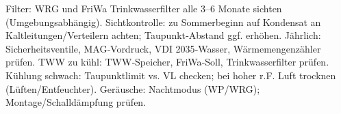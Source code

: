 {}\markdownRendererUlBeginTight
\markdownRendererUlItem Filter: WRG und FriWa Trinkwasserfilter alle 3–6 Monate sichten (Umgebungsabhängig).\markdownRendererUlItemEnd 
\markdownRendererUlItem Sichtkontrolle: zu Sommerbeginn auf Kondensat an Kaltleitungen/Verteilern achten; Taupunkt‑Abstand ggf. erhöhen.\markdownRendererUlItemEnd 
\markdownRendererUlItem Jährlich: Sicherheitsventile, MAG‑Vordruck, VDI 2035‑Wasser, Wärmemengenzähler prüfen.\markdownRendererUlItemEnd 
\markdownRendererUlEndTight \markdownRendererInterblockSeparator
{}
\markdownRendererSectionEnd \markdownRendererSectionBegin
{}\markdownRendererInterblockSeparator
{}\markdownRendererUlBeginTight
\markdownRendererUlItem TWW zu kühl: TWW‑Speicher, FriWa‑Soll, Trinkwasserfilter prüfen.\markdownRendererUlItemEnd 
\markdownRendererUlItem Kühlung schwach: Taupunktlimit vs. VL checken; bei hoher r.F. Luft trocknen (Lüften/Entfeuchter).\markdownRendererUlItemEnd 
\markdownRendererUlItem Geräusche: Nachtmodus (WP/WRG); Montage/Schalldämpfung prüfen.\markdownRendererUlItemEnd 
\markdownRendererUlEndTight 
\markdownRendererSectionEnd 
\markdownRendererSectionEnd \markdownRendererDocumentEnd